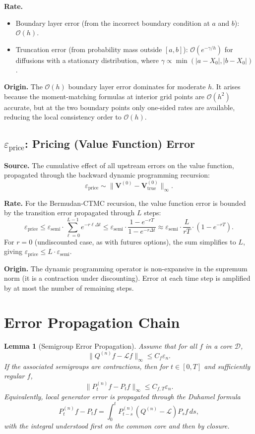 \documentclass[11pt,a4paper,openany]{book}
\theoremstyle{definition}
\theoremstyle{plain}
\newtheorem{lemma}[theorem]{Lemma}
\theoremstyle{remark}
\newcommand{\1}{\mathbbm{1}}
\begin{document}
\textbf{Rate.}
\begin{itemize}
    \item Boundary layer error (from the incorrect boundary condition at $a$ and $b$): $\mathcal{O}(h)$.
    \item Truncation error (from probability mass outside $[a,b]$): $\mathcal{O}(e^{-\gamma / h})$ for diffusions with a stationary distribution, where $\gamma \propto \min(|a - X_{0}|, |b - X_{0}|)$.
\end{itemize}

\textbf{Origin.} The $\mathcal{O}(h)$ boundary layer error dominates for moderate $h$. It arises because the moment-matching formulas at interior grid points are $\mathcal{O}(h^{2})$ accurate, but at the two boundary points only one-sided rates are available, reducing the local consistency order to $\mathcal{O}(h)$.

\subsection{$\varepsilon_{\text{price}}$: Pricing (Value Function) Error}

\textbf{Source.} The cumulative effect of all upstream errors on the value function, propagated through the backward dynamic programming recursion:
\[
\varepsilon_{\text{price}} \sim \|\mathbf{V}^{(0)} - \mathbf{V}_{\text{true}}^{(0)}\|_{\infty}.
\]

\textbf{Rate.} For the Bermudan-CTMC recursion, the value function error is bounded by the transition error propagated through $L$ steps:
\[
\varepsilon_{\text{price}} \leq \varepsilon_{\text{semi}} \cdot \sum_{\ell=0}^{L-1} e^{-r \ell \Delta t} \leq \varepsilon_{\text{semi}} \cdot \frac{1 - e^{-r T}}{1 - e^{-r \Delta t}} \approx \varepsilon_{\text{semi}} \cdot \frac{L}{r T} \cdot (1 - e^{-r T}).
\]
For $r=0$ (undiscounted case, as with futures options), the sum simplifies to $L$, giving $\varepsilon_{\text{price}} \leq L \cdot \varepsilon_{\text{semi}}$.

\textbf{Origin.} The dynamic programming operator is non-expansive in the supremum norm (it is a contraction under discounting). Error at each time step is amplified by at most the number of remaining steps.

\section{Error Propagation Chain}

\begin{lemma}[Semigroup Error Propagation]
Assume that for all $f$ in a core $\mathcal{D}$,
\[
\|Q^{(n)}f-\mathcal{L}f\|_\infty \le C_f\varepsilon_n.
\]
If the associated semigroups are contractions, then for $t\in[0,T]$ and sufficiently regular $f$,
\[
\|P_t^{(n)}f-P_tf\|_\infty \le C_{f,T}\varepsilon_n.
\]
Equivalently, local generator error is propagated through the Duhamel formula
\[
P_t^{(n)}f-P_tf = \int_0^t P_{t-s}^{(n)}(Q^{(n)}-\mathcal{L})P_sf\,ds,
\]
with the integral understood first on the common core and then by closure.
\end{lemma}
\end{document}
